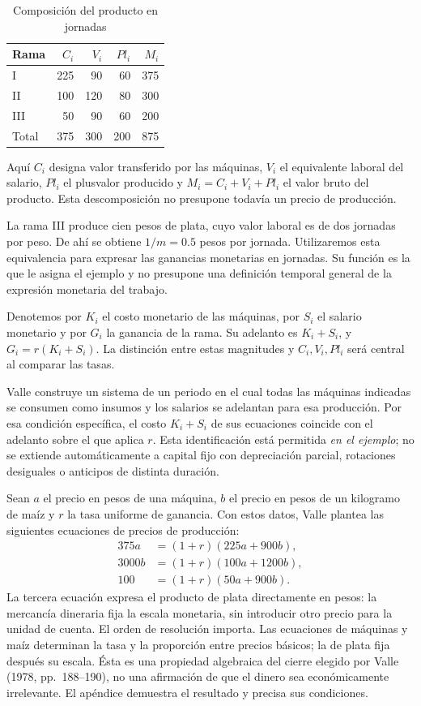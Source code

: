 \documentclass[10pt,twoside]{article}
\begin{document}
\begin{table}[htbp]\centering\footnotesize
\caption{Composición del producto en jornadas}
\begin{tabular}{@{}lrrrr@{}}\toprule
Rama & $C_i$ & $V_i$ & $Pl_i$ & $M_i$\\\midrule
I & 225 & 90 & 60 & 375\\
II & 100 & 120 & 80 & 300\\
III & 50 & 90 & 60 & 200\\\midrule
Total & 375 & 300 & 200 & 875\\\bottomrule
\end{tabular}
\end{table}
Aquí $C_i$ designa valor transferido por las máquinas, $V_i$ el equivalente laboral del salario, $Pl_i$ el plusvalor producido y $M_i=C_i+V_i+Pl_i$ el valor bruto del producto. Esta descomposición no presupone todavía un precio de producción.

La rama III produce cien pesos de plata, cuyo valor laboral es de dos jornadas por peso. De ahí se obtiene $1/m=0.5$ pesos por jornada. Utilizaremos esta equivalencia para expresar las ganancias monetarias en jornadas. Su función es la que le asigna el ejemplo y no presupone una definición temporal general de la expresión monetaria del trabajo.

Denotemos por $K_i$ el costo monetario de las máquinas, por $S_i$ el salario monetario y por $G_i$ la ganancia de la rama. Su adelanto es $K_i+S_i$, y $G_i=r(K_i+S_i)$. La distinción entre estas magnitudes y $C_i,V_i,Pl_i$ será central al comparar las tasas.

Valle construye un sistema de un periodo en el cual todas las máquinas indicadas se consumen como insumos y los salarios se adelantan para esa producción. Por esa condición específica, el costo $K_i+S_i$ de sus ecuaciones coincide con el adelanto sobre el que aplica $r$. Esta identificación está permitida \emph{en el ejemplo}; no se extiende automáticamente a capital fijo con depreciación parcial, rotaciones desiguales o anticipos de distinta duración. 

Sean $a$ el precio en pesos de una máquina, $b$ el precio en pesos de un kilogramo de maíz y $r$ la tasa uniforme de ganancia. Con estos datos, Valle plantea las siguientes ecuaciones de precios de producción:
\begin{align}
375a&=(1+r)(225a+900b),\label{eq:valle1}\\
3000b&=(1+r)(100a+1200b),\label{eq:valle2}\\
100&=(1+r)(50a+900b).\label{eq:valle3}
\end{align}
La tercera ecuación expresa el producto de plata directamente en pesos: la mercancía dineraria fija la escala monetaria, sin introducir otro precio para la unidad de cuenta. El orden de resolución importa. Las ecuaciones de máquinas y maíz determinan la tasa y la proporción entre precios básicos; la de plata fija después su escala. Ésta es una propiedad algebraica del cierre elegido por Valle (1978, pp.~188--190), no una afirmación de que el dinero sea económicamente irrelevante. El apéndice demuestra el resultado y precisa sus condiciones.
\end{document}
